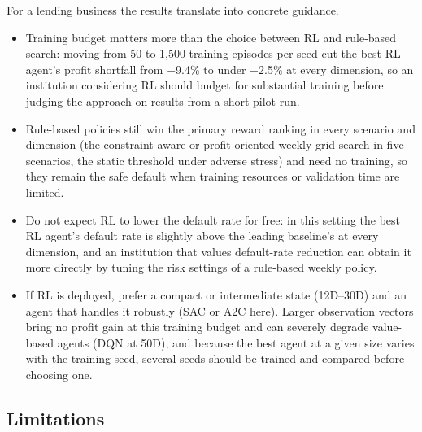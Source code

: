 \documentclass[preprint,review,authoryear,12pt]{elsarticle}
\begin{document}
For a lending business the results translate into concrete guidance.
\begin{itemize}
    \item Training budget matters more than the choice between RL and rule-based search:
          moving from 50 to 1{,}500 training episodes per seed cut the best RL agent's
          profit shortfall from $-$9.4\% to under $-$2.5\% at every dimension, so an
          institution considering RL should budget for substantial training before judging
          the approach on results from a short pilot run.
    \item Rule-based policies still win the primary reward ranking in every scenario and
          dimension (the constraint-aware or profit-oriented weekly grid search in five
          scenarios, the static threshold under adverse stress) and need no training, so
          they remain the safe default when training resources or validation time are
          limited.
    \item Do not expect RL to lower the default rate for free: in this setting the best
          RL agent's default rate is slightly above the leading baseline's at every
          dimension, and an institution that values default-rate reduction can obtain it
          more directly by tuning the risk settings of a rule-based weekly policy.
    \item If RL is deployed, prefer a compact or intermediate state (12D--30D) and an
          agent that handles it robustly (SAC or A2C here). Larger observation vectors
          bring no profit gain at this training budget and can severely degrade
          value-based agents (DQN at 50D), and because the best agent at a given size
          varies with the training seed, several seeds should be trained and compared
          before choosing one.
\end{itemize}

\subsection{Limitations}
\end{document}
